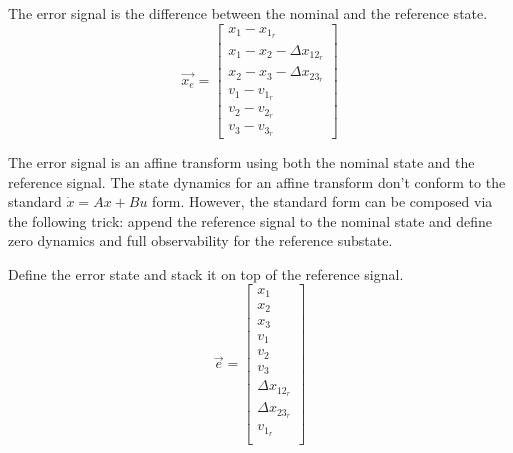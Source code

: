 \documentclass[12pt,onecolumn,reqno]{amsart}
\begin{document}
The error signal is the difference between the nominal and the reference state.
\begin{equation}
  \vec{x_{e}} = 
  \begin{bmatrix}
    x_{1} - x_{1_{r}}                 \\ 
    x_{1} - x_{2} - \Delta x_{12_{r}} \\
    x_{2} - x_{3} - \Delta x_{23_{r}} \\
    v_{1} - v_{1_{r}}                 \\
    v_{2} - v_{2_{r}}                 \\
    v_{3} - v_{3_{r}}
  \end{bmatrix}
\end{equation}

The error signal is an affine transform using both the nominal state and the
reference signal. The state dynamics for an affine transform don't conform to
the standard $\dot{x} = Ax + Bu$ form. However, the standard form can be
composed via the following trick: append the reference signal to the nominal
state and define zero dynamics and full observability for the reference
substate.

Define the error state and stack it on top of the reference signal. 
\begin{equation}
  \vec{e} = 
  \begin{bmatrix}
    x_{1}             \\
    x_{2}             \\
    x_{3}             \\
    v_{1}             \\
    v_{2}             \\
    v_{3}             \\ 
    \Delta x_{12_{r}} \\
    \Delta x_{23_{r}} \\
    v_{1_{r}}         \\
  \end{bmatrix}
\end{equation}
\end{document}
